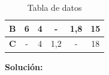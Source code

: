 \documentclass[../main.tex]{subfiles}
\begin{document}
\begin{exercise}
\begin{table}[ht]
\begin{tabular}{|c|cc|cc|c|}
                \textbf{B}                                                                           & \multicolumn{1}{c|}{6}                                         & 4                                         & \multicolumn{1}{c|}{-}                                            & 1,8                                       & 15                                                                                                     \\ \hline
                \textbf{C}                                                                           & \multicolumn{1}{c|}{-}                                         & 4                                         & \multicolumn{1}{c|}{1,2}                                          & -                                         & 18                                                                                                     \\ \hline
                \end{tabular}
                \caption{Tabla de datos}
            \end{table}

            \textbf{Solución:}
        \end{exercise}
\end{document}
